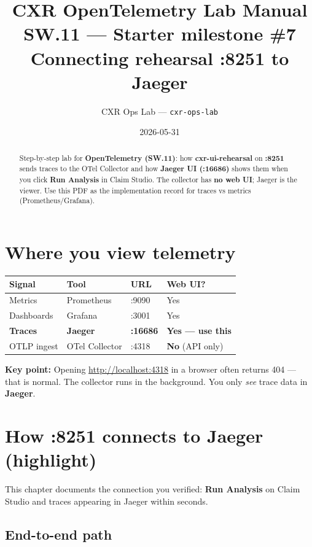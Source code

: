 \documentclass[11pt,a4paper]{report}
\title{CXR OpenTelemetry Lab Manual\\
\large SW.11 --- Starter milestone \#7\\
\large Connecting rehearsal :8251 to Jaeger}
\author{CXR Ops Lab --- \texttt{cxr-ops-lab}}
\date{2026-05-31}
\begin{document}
\maketitle
\begin{abstract}
Step-by-step lab for \textbf{OpenTelemetry (SW.11)}: how \textbf{cxr-ui-rehearsal} on
\textbf{:8251} sends traces to the OTel Collector and how \textbf{Jaeger UI (:16686)} shows them
when you click \textbf{Run Analysis} in Claim Studio. The collector has \textbf{no web UI}; Jaeger is the viewer.
Use this PDF as the implementation record for traces vs metrics (Prometheus/Grafana).
\end{abstract}
\tableofcontents
\newpage

\chapter{Where you view telemetry}

\begin{center}
\begin{tabular}{llll}
\toprule
Signal & Tool & URL & Web UI? \\
\midrule
Metrics & Prometheus & :9090 & Yes \\
Dashboards & Grafana & :3001 & Yes \\
\textbf{Traces} & \textbf{Jaeger} & \textbf{:16686} & \textbf{Yes --- use this} \\
OTLP ingest & OTel Collector & :4318 & \textbf{No} (API only) \\
\bottomrule
\end{tabular}
\end{center}

\noindent\textbf{Key point:} Opening \url{http://localhost:4318} in a browser often returns 404 --- that is normal.
The collector runs in the background. You only \emph{see} trace data in \textbf{Jaeger}.

\chapter{How :8251 connects to Jaeger (highlight)}

This chapter documents the connection you verified: \textbf{Run Analysis} on Claim Studio
and traces appearing in Jaeger within seconds.

\section{End-to-end path}
\end{document}

